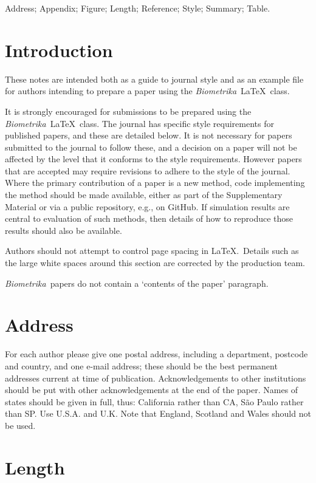 \documentclass[lineno]{biometrika}
\def\Bka{{\it Biometrika}}
\begin{document}
\begin{keywords}
Address; Appendix; Figure; Length; Reference; Style; Summary; Table.
\end{keywords}

\section{Introduction}

These notes are intended both as a guide to journal style and as an example file for authors intending to prepare a paper using  the \Bka\ \LaTeX\ class.

It is strongly encouraged for submissions to be prepared using the \Bka\ \LaTeX\ class. The journal has specific style requirements for published papers, and these are detailed below. It is not necessary for papers submitted to the journal to follow these, and a decision on a paper will not be affected by the level that it conforms to the style requirements. However papers that are accepted may require revisions to adhere to the style of the journal. Where the primary contribution of a paper is a new method, code implementing the method should be made available, either as part of the Supplementary Material or via a public repository, e.g., on GitHub. If simulation results are central to evaluation of such methods, then details of how to reproduce those results should also be available. 

Authors should not attempt to control page spacing in \LaTeX.\  Details such as the large white spaces around this section are corrected by the production team.

\Bka\  papers do not contain a `contents of the paper' paragraph.

\section{Address}

For each author please give one postal address, including a department, postcode and country, and one e-mail address; these should be the best permanent addresses current at time of publication. Acknowledgements to other institutions should be put with other acknowledgements at the end of the paper. Names of states should be given in full, thus: California rather than CA, S\~ao Paulo rather than SP. Use U.S.A. and U.K. Note that England, Scotland and Wales should not be used.

\section{Length}
\end{document}
